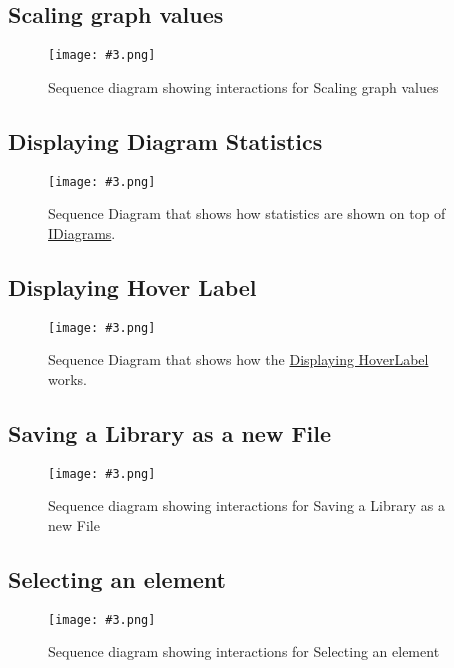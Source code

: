 \documentclass[10pt,a4paper]{report}
\newcommand{\refer}[2]{\hyperref[#1]{\textcolor{col:reference}{#2}}}
\newcommand{\includeimage}[5]{
    \begin{figure}[H]
        #1
        \texttt{[image: \#3.png]}
        \caption{#4}
        \label{fig:#5}
    \end{figure}
}
\newcommand{\packagebeginning}{edu.kit.informatik.pse.gelf} %
\newcommand{\lblroot}{lbl} %
\newcommand{\lblpackage}{} %
\newcommand{\lblpackageelement}{} %
\newcommand{\lblpackageelementmember}{} %
\newcommand{\lblpackageelementmemberparameter}{} %
\newcommand{\casclabelname}{\lblroot\lblpackage\lblpackageelement\lblpackageelementmember\lblpackageelementmemberparameter}
\newcommand{\casclabel}{\label{\casclabelname}}
\begin{document}
\subsection{Scaling graph values}
\includeimage{}{0.35}{scalingvalues}{Sequence diagram showing interactions for Scaling graph values}{Scaling Values}
\subsection{Displaying Diagram Statistics}
\includeimage{}{0.30}{DiagramStatistics}{Sequence Diagram that shows how statistics are shown on top of \refer{\lblroot:view.diagrams:IDiagram}{IDiagrams}.}{Displaying Diagram Statistics}
\subsection{Displaying Hover Label}
\includeimage{}{0.35}{HoverLabelDiagram}{Sequence Diagram that shows how the \refer{\lblroot:view.diagrams.components:HoverLabel}{Displaying HoverLabel} works.}{Hover Label}
\subsection{Saving a Library as a new File} %
\includeimage{}{0.35}{FR-21}{Sequence diagram showing interactions for Saving a Library as a new File}{Saving a Library as a new File}
\subsection{Selecting an element}
\includeimage{}{0.5}{Select}{Sequence diagram showing interactions for Selecting an element}{Selecting an element}
\end{document}

